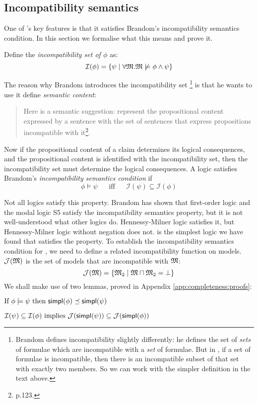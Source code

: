 \subsection{Incompatibility semantics}\label{incompatibility}

\NI One of \cathoristic{}'s key features is that it satisfies Brandom's
incompatibility semantics condition. In this section we formalise what
this means and prove it.

Define the \emph{incompatibility set of $\phi$} as:
\[
\mathcal{I}(\phi) = \{
  \psi \; | \; \forall \frak{M}. \frak{M} \not \models \phi \land \psi\}
\]

\NI The reason why Brandom introduces the incompatibility set
\footnote{Brandom \cite{brandom} defines incompatibility slightly
  differently: he defines the set of \emph{sets} of formulae which are
  incompatible with a \emph{set} of formulae.  But in \cathoristic{},
  if a set of formulae is incompatible, then there is an incompatible
  subset of that set with exactly two members.  So we can work with
  the simpler definition in the text above.} is that he
wants to use it define \emph{semantic content}:
\begin{quote}
  Here is a semantic suggestion: represent the propositional content
  expressed by a sentence with the set of sentences that express
  propositions incompatible with it\footnote{\cite{brandom} p.123.}.
\end{quote}
Now if the propositional content of a claim determines its logical consequences, and the propositional content is identified with the incompatibility set, then the incompatibility set must determine the logical consequences.
A logic satisfies Brandom's \emph{incompatibility semantics condition} if
\[
\phi \models \psi \; \quad\mbox{ iff }\quad \; \mathcal{I}(\psi) \subseteq \mathcal{I}(\phi)
\]

\NI Not all logics satisfy this property.  Brandom has shown that
first-order logic and the modal logic S5 satisfy the incompatibility
semantics property, but it is not well-understood what other logics
do.  Hennessy-Milner logic satisfies it, but Hennessy-Milner logic
without negation does not.  \Cathoristic{} is the simplest logic we
have found that satisfies the property.  To establish the
incompatibility semantics condition for \cathoristic, we need to
define a related incompatibility function on models.
$\mathcal{J}(\frak{M})$ is the set of models that are incompatible with
$\frak{M}$:
\[
\mathcal{J}(\frak{M}) = \{ \frak{M}_2 \; | \; \frak{M} \sqcap \frak{M}_2 = \bot \}
\]
We shall make use of two lemmas, proved in Appendix
\ref{app:completeness:proofs}:
\begin{lemma}
\label{inc1}
$\mbox{If }\phi \models \psi \mbox{ then } \mathsf{simpl}(\phi) \preceq \mathsf{simpl}(\psi)$
\end{lemma}
\begin{lemma}
\label{inc3}
$\mathcal{I}(\psi) \subseteq \mathcal{I}(\phi) \mbox{ implies } \mathcal{J}(\mathsf{simpl}(\psi)) \subseteq \mathcal{J}(\mathsf{simpl}(\phi))$
\end{lemma}

